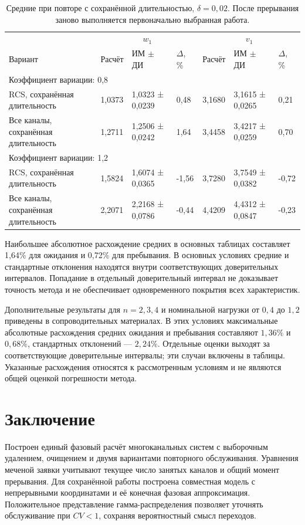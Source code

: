 \begin{table}[!htbp]
\centering\small\setlength{\tabcolsep}{2pt}
\begin{tabular}{@{}p{4.16cm}p{1.61cm}p{2.83cm}p{1.28cm}p{1.61cm}p{2.83cm}p{1.28cm}@{}}
\toprule
 & \multicolumn{3}{c}{$w_1$} & \multicolumn{3}{c}{$v_1$} \\
Вариант & Расчёт & ИМ $\pm$ ДИ & $\Delta$, \% & Расчёт & ИМ $\pm$ ДИ & $\Delta$, \% \\
\midrule
\multicolumn{7}{l}{Коэффициент вариации: 0,8} \\
RCS, сохранённая длительность & 1,0373 & 1,0323 ± 0,0239 & 0,48 & 3,1680 & 3,1615 ± 0,0265 & 0,21 \\
Все каналы, сохранённая длительность & 1,2711 & 1,2506 ± 0,0242 & 1,64 & 3,4458 & 3,4217 ± 0,0259 & 0,70 \\
\multicolumn{7}{l}{Коэффициент вариации: 1,2} \\
RCS, сохранённая длительность & 1,5824 & 1,6074 ± 0,0365 & -1,56 & 3,7280 & 3,7549 ± 0,0382 & -0,72 \\
Все каналы, сохранённая длительность & 2,2071 & 2,2168 ± 0,0786 & -0,44 & 4,4209 & 4,4312 ± 0,0847 & -0,23 \\
\bottomrule
\end{tabular}
\caption{Средние при повторе с сохранённой длительностью, $\delta=0{,}02$. После прерывания заново выполняется первоначально выбранная работа.}
\label{tab:results_fixed}
\end{table}

Наибольшее абсолютное расхождение средних в основных таблицах составляет 1,64\% для ожидания и 0,72\% для пребывания. В основных условиях средние и стандартные отклонения находятся внутри соответствующих доверительных интервалов. Попадание в отдельный доверительный интервал не доказывает точность метода и не обеспечивает одновременного покрытия всех характеристик.

Дополнительные результаты для \(n=2,3,4\) и номинальной нагрузки от \(0{,}4\) до \(1{,}2\) приведены в сопроводительных материалах. В этих условиях максимальные абсолютные расхождения средних ожидания и пребывания составляют \(1{,}36\%\) и \(0{,}68\%\), стандартных отклонений --- \(2{,}24\%\). Отдельные оценки выходят за соответствующие доверительные интервалы; эти случаи включены в таблицы. Указанные расхождения относятся к рассмотренным условиям и не являются общей оценкой погрешности метода.

\section{Заключение}
Построен единый фазовый расчёт многоканальных систем с выборочным удалением, очищением и двумя вариантами повторного обслуживания. Уравнения меченой заявки учитывают текущее число занятых каналов и общий момент прерывания. Для сохранённой работы построена совместная модель с непрерывными координатами и её конечная фазовая аппроксимация. Положительное представление гамма-распределения позволяет уточнять обслуживание при \(CV<1\), сохраняя вероятностный смысл переходов.

